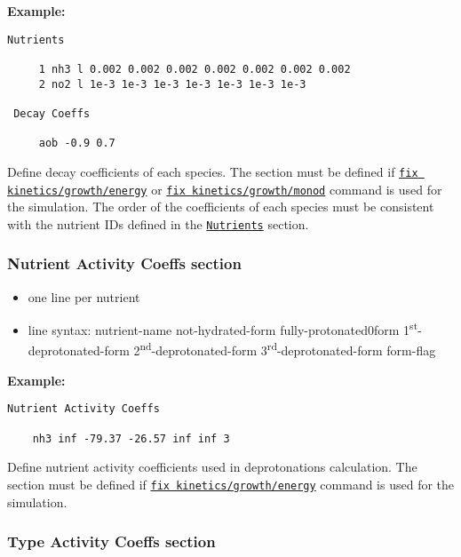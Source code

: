 \documentclass[11pt,a4paper,openright]{article}
\begin{document}
\textbf{Example:}
\begin{Verbatim}[frame=single]
 Nutrients

     1 nh3 l 0.002 0.002 0.002 0.002 0.002 0.002 0.002
     2 no2 l 1e-3 1e-3 1e-3 1e-3 1e-3 1e-3 1e-3
     
 Decay Coeffs
         
     aob -0.9 0.7

\end{Verbatim}

Define decay coefficients of each species. 
The section must be defined if 
\hyperref[fkineticsenergy]{\tt fix kinetics/growth/energy}
or
\hyperref[fkineticsmonod]{\tt fix kinetics/growth/monod}
command is used for the simulation. 
The order of the coefficients of each species must be consistent 
with the nutrient IDs defined in the \hyperref[snutrients]{\tt Nutrients} section.


\subsubsection{Nutrient Activity Coeffs section}
\label{sactivitycoeff}

\begin{itemize} [nosep]
    \item one line per nutrient
    \item line syntax: nutrient-name {} not-hydrated-form {} fully-protonated0form {} 1\textsuperscript{st}-deprotonated-form {} 2\textsuperscript{nd}-deprotonated-form {} 3\textsuperscript{rd}-deprotonated-form {} form-flag \\
    
\end{itemize} 

\textbf{Example:}
\begin{Verbatim}[frame=single]
 Nutrient Activity Coeffs

    nh3 inf -79.37 -26.57 inf inf 3

\end{Verbatim}

Define nutrient activity coefficients used in deprotonations calculation.
The section must be defined if 
\hyperref[fkineticsenergy]{\tt fix kinetics/growth/energy}
command is used for the simulation. 

\subsubsection{Type Activity Coeffs section}
\label{stactivitycoeff}
\end{document}
